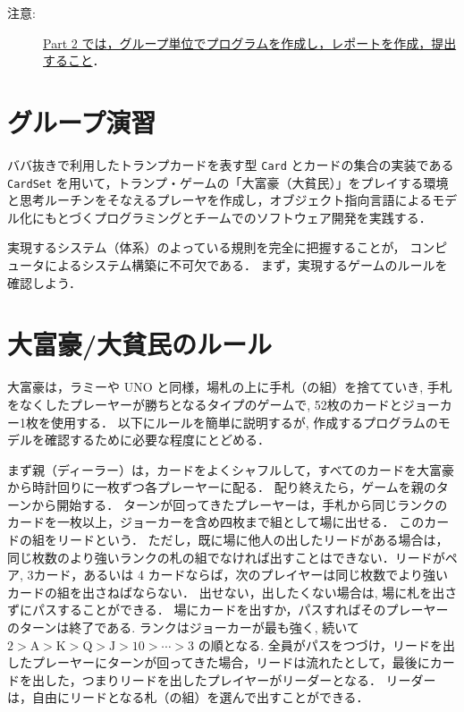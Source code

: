 %
%

\maketitle

\medskip

\begin{description}
\item[注意:] \underline{Part 2 では，グループ単位でプログラムを作成し，レポートを作成，提出すること}．
\end{description}

\medskip

\section{グループ演習}
ババ抜きで利用したトランプカードを表す型 \verb+Card+ とカードの集合の実装である \verb+CardSet+ を用いて，トランプ・ゲームの「大富豪（大貧民）」をプレイする環境と思考ルーチンをそなえるプレーヤを作成し，オブジェクト指向言語によるモデル化にもとづくプログラミングとチームでのソフトウェア開発を実践する．

実現するシステム（体系）のよっている規則を完全に把握することが，
コンピュータによるシステム構築に不可欠である．
まず，実現するゲームのルールを確認しよう．

\section{大富豪/大貧民のルール}

大富豪は，ラミーや UNO と同様，場札の上に手札（の組）を捨てていき, 手札をなくしたプレーヤーが勝ちとなるタイプのゲームで, 52枚のカードとジョーカー1枚を使用する．
以下にルールを簡単に説明するが, 作成するプログラムのモデルを確認するために必要な程度にとどめる．  

まず親（ディーラー）は，カードをよくシャフルして，すべてのカードを大富豪から時計回りに一枚ずつ各プレーヤーに配る．
配り終えたら，ゲームを親のターンから開始する．
ターンが回ってきたプレーヤーは，手札から同じランクのカードを一枚以上，ジョーカーを含め四枚まで組として場に出せる．
このカードの組をリードという．
ただし，既に場に他人の出したリードがある場合は，同じ枚数のより強いランクの札の組でなければ出すことはできない．リードがペア, 3カード，あるいは 4 カードならば，次のプレイヤーは同じ枚数でより強いカードの組を出さねばならない．
出せない，出したくない場合は, 場に札を出さずにパスすることができる．
場にカードを出すか，パスすればそのプレーヤーのターンは終了である. 
ランクはジョーカーが最も強く, 続いて $2 > \mathrm{A} > \mathrm{K} > \mathrm{Q} > \mathrm{J} > 10 > \cdots > 3$ の順となる. 
全員がパスをつづけ，リードを出したプレーヤーにターンが回ってきた場合，リードは流れたとして，最後にカードを出した，つまりリードを出したプレイヤーがリーダーとなる．
リーダーは，自由にリードとなる札（の組）を選んで出すことができる．


